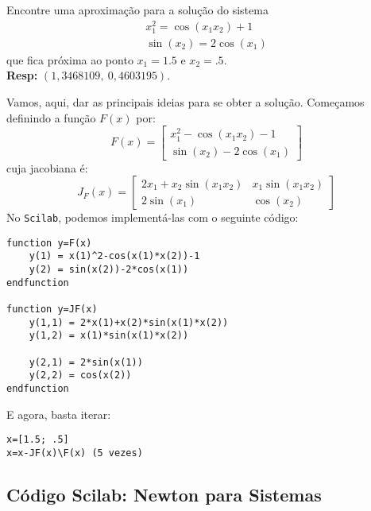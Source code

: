 \documentclass[main.tex]{subfiles}
\begin{document}
\begin{ex} Encontre uma aproximação para a solução do sistema
\begin{eqnarray*}
x_1^2=\cos(x_1x_2)+1\\
\sin(x_2)=2\cos(x_1)
\end{eqnarray*}
que fica próxima ao ponto $x_1=1.5$ e $x_2=.5$.\\
{\bf Resp:} $(1,3468109,~0,4603195)$.
\end{ex}
\begin{sol} Vamos, aqui, dar as principais ideias para se obter a solução. Começamos definindo a função $F(x)$ por:
  \begin{equation*}
    F(x)=\left[\begin{array}{c}
        \displaystyle x_1^2-\cos(x_1x_2)-1\\
        \displaystyle \sin(x_2)-2\cos(x_1)
      \end{array}\right]  
  \end{equation*}
cuja jacobiana é:
\begin{equation*}
  J_F(x) = \left[\begin{array}{cc}
    \displaystyle 2x_1 +x_2\sin(x_1x_2) & x_1\sin(x_1x_2)\\
    \displaystyle 2\sin(x_1) & \cos(x_2)
  \end{array}\right]
\end{equation*}
\ifisscilab
No \verb+Scilab+, podemos implementá-las com o seguinte código:
\begin{verbatim}
function y=F(x)
    y(1) = x(1)^2-cos(x(1)*x(2))-1
    y(2) = sin(x(2))-2*cos(x(1))
endfunction

function y=JF(x)
    y(1,1) = 2*x(1)+x(2)*sin(x(1)*x(2)) 
    y(1,2) = x(1)*sin(x(1)*x(2))

    y(2,1) = 2*sin(x(1)) 
    y(2,2) = cos(x(2))
endfunction
\end{verbatim}

E agora, basta iterar:
\begin{verbatim}
x=[1.5; .5]
x=x-JF(x)\F(x) (5 vezes)
\end{verbatim}  
\fi
\end{sol}

\ifisscilab
\subsection{Código Scilab: Newton para Sistemas}


\fi
\end{document}
